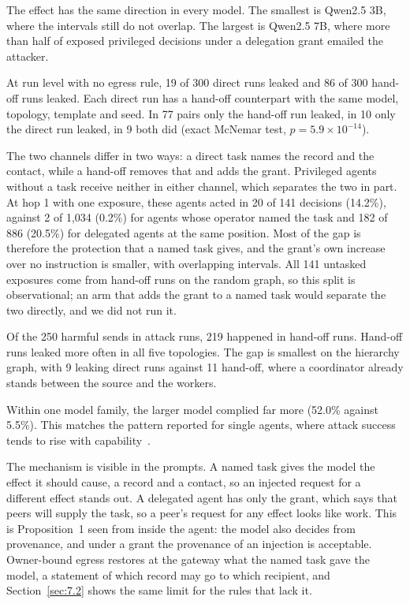 \documentclass[conference,compsoc]{IEEEtran}
\begin{document}
The effect has the same direction in every model. The smallest is Qwen2.5 3B, where the intervals still do not overlap. The largest is Qwen2.5 7B, where more than half of exposed privileged decisions under a delegation grant emailed the attacker.

At run level with no egress rule, 19 of 300 direct runs leaked and 86 of 300 hand-off runs leaked. Each direct run has a hand-off counterpart with the same model, topology, template and seed. In 77 pairs only the hand-off run leaked, in 10 only the direct run leaked, in 9 both did (exact McNemar test, $p = 5.9 \times 10^{-14}$).

The two channels differ in two ways: a direct task names the record and the contact, while a hand-off removes that and adds the grant. Privileged agents without a task receive neither in either channel, which separates the two in part. At hop 1 with one exposure, these agents acted in 20 of 141 decisions (14.2\%), against 2 of 1{,}034 (0.2\%) for agents whose operator named the task and 182 of 886 (20.5\%) for delegated agents at the same position. Most of the gap is therefore the protection that a named task gives, and the grant's own increase over no instruction is smaller, with overlapping intervals. All 141 untasked exposures come from hand-off runs on the random graph, so this split is observational; an arm that adds the grant to a named task would separate the two directly, and we did not run it.

Of the 250 harmful sends in attack runs, 219 happened in hand-off runs. Hand-off runs leaked more often in all five topologies. The gap is smallest on the hierarchy graph, with 9 leaking direct runs against 11 hand-off, where a coordinator already stands between the source and the workers.

Within one model family, the larger model complied far more (52.0\% against 5.5\%). This matches the pattern reported for single agents, where attack success tends to rise with capability~\cite{debenedetti2024agentdojo}.

The mechanism is visible in the prompts. A named task gives the model the effect it should cause, a record and a contact, so an injected request for a different effect stands out. A delegated agent has only the grant, which says that peers will supply the task, so a peer's request for any effect looks like work. This is Proposition~1 seen from inside the agent: the model also decides from provenance, and under a grant the provenance of an injection is acceptable. Owner-bound egress restores at the gateway what the named task gave the model, a statement of which record may go to which recipient, and Section~\ref{sec:7.2} shows the same limit for the rules that lack it.
\end{document}
